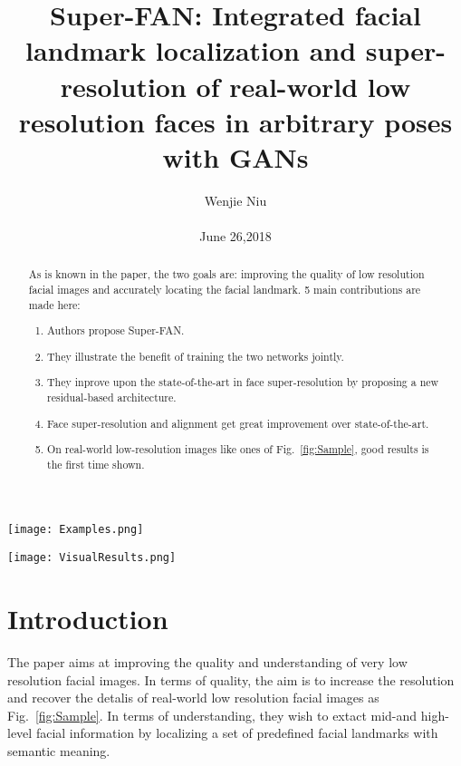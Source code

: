 \documentclass[10pt,twocolumn,letterpaper]{article}
\begin{document}
\title{Super-FAN: Integrated facial landmark localization and super-resolution of real-world low resolution faces in arbitrary poses with GANs}

\author{Wenjie Niu\\\\ June 26,2018}

\maketitle

\begin{figure*}
\begin{center}
   \texttt{[image: Examples.png]}
\end{center}
   \caption{A few examples of visual results produced by our system on real-world low resolution faces from WiderFace.\cite{Bulat_2018_CVPR}}
\label{fig:Sample}
\end{figure*}

 \begin{figure*}
\begin{center}
   \texttt{[image: VisualResults.png]}
\end{center}
   \caption{Visual results on LS3D-W.\cite{Bulat_2018_CVPR}}
\label{fig:Results}
\end{figure*}

\begin{abstract}
As is known in the paper, the two goals are: improving the quality of low resolution facial images and accurately locating the facial landmark. 5 main contributions are made here:
\begin{enumerate}
\item Authors propose Super-FAN.
\item They illustrate the benefit of training the two networks jointly.
\item They inprove upon the state-of-the-art in face super-resolution by proposing a new residual-based architecture. 
\item Face super-resolution and alignment get great improvement over state-of-the-art.
\item On real-world low-resolution images like ones of Fig.~\ref{fig:Sample}, good results is the first time shown.
\end{enumerate}
\end{abstract}

\section{Introduction}
The paper aims at improving the quality and understanding of very low resolution facial images. In terms of quality, the aim is to increase the resolution and recover the detalis of real-world low resolution facial images as Fig.~\ref{fig:Sample}. In terms of understanding,  they wish to extact mid-and high-level facial information by localizing a set of predefined facial landmarks with semantic meaning.\par
\end{document}
